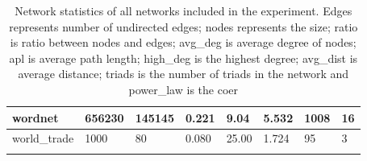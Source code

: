 \begin{longtable}[c]{|l|l|l|l|l|l|l|l|}
			wordnet             & 656230         & 145145         & 0.221          & 9.04              & 5.532        & 1008               & 16                \\ \hline
			world\_trade        & 1000           & 80             & 0.080          & 25.00             & 1.724        & 95                 & 3                 \\ \hline
			\caption{Network statistics of all networks included in the experiment. Edges represents number of undirected edges; nodes represents the size; ratio is ratio between nodes and edges; avg\_deg is average degree of nodes; apl is average path length; high\_deg is the highest degree; avg\_dist is average distance; triads is the number of triads in the network and power\_law is the coer}
			\label{tab:inf-framework-network-stats-a}\\
		\end{longtable}
		
